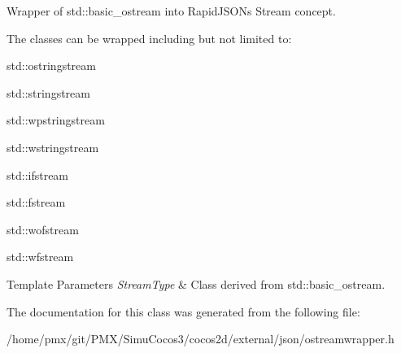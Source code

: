Wrapper of {\ttfamily std\+::basic\+\_\+ostream} into Rapid\+J\+S\+ON\textquotesingle{}s Stream concept. 

The classes can be wrapped including but not limited to\+:


\begin{DoxyItemize}
\item {\ttfamily std\+::ostringstream} 
\item {\ttfamily std\+::stringstream} 
\item {\ttfamily std\+::wpstringstream} 
\item {\ttfamily std\+::wstringstream} 
\item {\ttfamily std\+::ifstream} 
\item {\ttfamily std\+::fstream} 
\item {\ttfamily std\+::wofstream} 
\item {\ttfamily std\+::wfstream} 
\end{DoxyItemize}


\begin{DoxyTemplParams}{Template Parameters}
{\em Stream\+Type} & Class derived from {\ttfamily std\+::basic\+\_\+ostream}. \\
\hline
\end{DoxyTemplParams}


The documentation for this class was generated from the following file\+:\begin{DoxyCompactItemize}
\item 
/home/pmx/git/\+P\+M\+X/\+Simu\+Cocos3/cocos2d/external/json/ostreamwrapper.\+h\end{DoxyCompactItemize}
